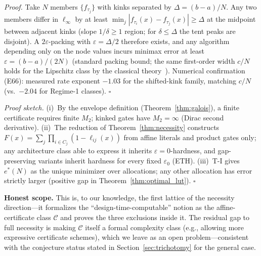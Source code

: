 \vspace{2pt}
\noindent\textit{Proof.}
Take $N$ members $\{f_{\tau_j}\}$ with kinks separated by
$\Delta = (b-a)/N$. Any two members differ in $\ell_\infty$ by at
least $\min_j |f_{\tau_i}(x) - f_{\tau_j}(x)| \geq \Delta$ at the
midpoint between adjacent kinks (slope $1/\delta \geq 1$ region; for
$\delta \leq \Delta$ the tent peaks are disjoint). A $2\varepsilon$-packing
with $\varepsilon = \Delta/2$ therefore exists, and any algorithm
depending only on the node values incurs minimax error at least
$\varepsilon = (b-a)/(2N)$ (standard packing bound; the same
first-order width $c/N$ holds for the Lipschitz class by the classical
theory~\cite{pinkus1985width}). Numerical confirmation (E66):
measured rate exponent $-1.03$ for the shifted-kink family, matching
$c/N$ (vs.\ $-2.04$ for Regime-1 classes). $\square$

\vspace{2pt}
\noindent\textit{Proof sketch.}
(i)~By the envelope definition (Theorem~\ref{thm:galois}), a finite
certificate requires finite $M_2$; kinked gates have $M_2 = \infty$
(Dirac second derivative). (ii)~The reduction of
Theorem~\ref{thm:necessity} constructs $F(x) = \sum_j \prod_{i \in
C_j}(1 - \ell_{ij}(x))$ from affine literals and product gates only;
any architecture class able to express it inherits
$\varepsilon = 0$-hardness, and gap-preserving variants inherit
hardness for every fixed $\varepsilon_0$ (ETH). (iii)~T-I gives
$e^{*}(N)$ as the unique minimizer over allocations; any other
allocation has error strictly larger (positive gap in
Theorem~\ref{thm:optimal_lut}). $\square$

\vspace{2pt}
\noindent\textbf{Honest scope.} This is, to our knowledge, the first lattice of the
necessity direction---it formalizes the ``design-time-computable''
notion as the affine-certificate class $\mathcal{C}$ and proves the
three exclusions inside it. The residual gap to full necessity is
making $\mathcal{C}$ itself a formal complexity class (e.g., allowing
more expressive certificate schemes), which we leave as an open
problem---consistent with the conjecture status stated in
Section~\ref{sec:trichotomy} for the general case.
